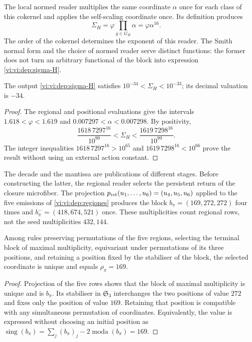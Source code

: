 The local normed reader multiplies the same coordinate \(\alpha\)
once for each class of this cokernel and applies the self-scaling
coordinate once. Its definition produces
\begin{equation}
 \Sigma_H=\varphi\prod_{g\in G_H}\alpha
         =\varphi\alpha^{16}.
 \label{vi:vi:dep:sigma-H}
\end{equation}
The order of the cokernel determines the exponent of this reader. The Smith
normal form and the choice of normed reader serve distinct
functions: the former does not turn an arbitrary functional of the block into
expression \eqref{vi:vi:dep:sigma-H}.

\begin{proposition}
\label{vi:vi:dep:decada}
The output \eqref{vi:vi:dep:sigma-H} satisfies
\(10^{-34}<\Sigma_H<10^{-33}\); its decimal valuation is \(-34\).
\end{proposition}
\begin{proof}
The regional and positional evaluations give the intervals
\(1.618<\varphi<1.619\) and \(0.007297<\alpha<0.007298\).
By positivity,
\[
 \frac{1618\,7297^{16}}{10^{99}}
 <\Sigma_H<
 \frac{1619\,7298^{16}}{10^{99}}.
\]
The integer inequalities
\(1618\,7297^{16}>10^{65}\) and
\(1619\,7298^{16}<10^{66}\) prove the result without using an
external action constant.
\end{proof}

The decade and the mantissa are publications of different stages.
Before constructing the latter, the regional reader selects the persistent
return of the closure microfiber. The projection
\(p_{\rm ret}(u_1,\ldots,u_6)=(u_4,u_5,u_6)\) applied to the
five emissions of \ref{vi:vi:dep:regiones} produces the block
\(b_\pi=(169,272,272)\) four times and
\(b_\pi^-=(418,674,521)\) once. These multiplicities count
regional rows, not the seed multiplicities \(432,144\).

\begin{proposition}
\label{vi:vi:dep:selector169}
Among rules preserving permutations of the five regions,
selecting the terminal block of maximal multiplicity, equivariant
under permutations of its three positions, and retaining a position fixed
by the stabiliser of the block, the selected coordinate is unique
and equals \(\rho_\pi=169\).
\end{proposition}
\begin{proof}
Projection of the five rows shows that the block of maximal
multiplicity is unique and is \(b_\pi\). Its stabiliser in
\(\mathfrak S_3\) interchanges the two positions of value \(272\)
and fixes only the position of value \(169\). Retaining that position
is compatible with any simultaneous permutation of coordinates.
Equivalently, the value is expressed without choosing an initial position
as
\(\operatorname{sing}(b_\pi)=\sum_j(b_\pi)_j
-2\operatorname{moda}(b_\pi)=169\).
\end{proof}

